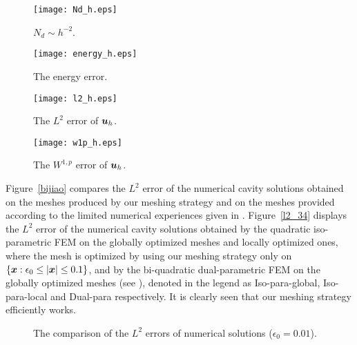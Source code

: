 \documentclass[12pt]{article}
\renewcommand{\vec}[1]{\mbox{\boldmath$#1$}}
\numberwithin{equation}{section}
\begin{document}
\begin{figure}[ht!]
	\begin{minipage}[l]{0.5\textwidth}
    \centering    \texttt{[image: Nd\_h.eps]}
	\vspace*{-4mm}
	\caption{$N_d \sim h^{-2}$.}\label{Nd_h}
\end{minipage}\hspace*{2mm}
\begin{minipage}[l]{0.5\textwidth}
\centering   \texttt{[image: energy\_h.eps]}
\vspace*{-4mm}
\caption{The energy error.}\label{energy error}
\end{minipage}
\end{figure}

\begin{figure}[ht!]
	\begin{minipage}[l]{0.5\textwidth}
    \centering    \texttt{[image: l2\_h.eps]}
	\vspace*{-4mm}
	\caption{The $L^2$ error of $\vec{u}_h$.}\label{l2 error}
\end{minipage}\hspace*{2mm}
\begin{minipage}[l]{0.5\textwidth}
\centering   \texttt{[image: w1p\_h.eps]}
\vspace*{-4mm}
\caption{The $W^{1,p}$ error of $\vec{u}_h$.}\label{w1p error}
\end{minipage}
\end{figure}

Figure~\ref{bijiao} compares the $L^2$ error of the numerical
cavity solutions obtained on the meshes produced by our meshing strategy and on
the meshes provided according to the limited numerical experiences given in
\cite{Lian and Li iso}. Figure~\ref{l2_34} displays the $L^2$ error of the numerical
cavity solutions obtained by the quadratic iso-parametric FEM on the globally optimized
meshes and locally optimized ones, where the mesh is optimized by using our meshing
strategy only on $\{\vec{x}: \epsilon_0\le |\vec{x}|\le 0.1\}$, and by the bi-quadratic dual-parametric
FEM on the globally optimized meshes (see \cite{SuLiRectan}), denoted in the legend
as Iso-para-global, Iso-para-local and Dual-para respectively. It is clearly seen
that our meshing strategy efficiently works.

\begin{figure}[h!]
     \begin{minipage}[c]{0.55\textwidth}\hspace{-2mm}
     \end{minipage}
     \begin{minipage}[c]{0.45\textwidth}\hspace{-8mm}
     \end{minipage}
     \vspace*{-4mm}
 \caption{The comparison of the $L^2$ errors of numerical solutions ($\epsilon_0=0.01$).}
 \label{bijiao-2}
\end{figure}
\end{document}
